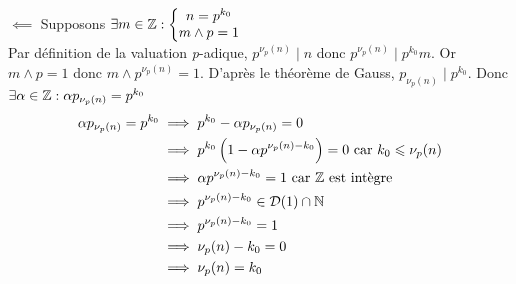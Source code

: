 \documentclass{article}
\renewenvironment{question_kholle}[2][ ]
{
	\subsection{\texorpdfstring{#2}{}}
	\notblank{#1}
	{
		\noindent #1
		\bigbreak
	}
	{}
	\begin{proof}
}
{
	\end{proof}
}
\begin{document}
\begin{question_kholle}
		$\impliedby$ Supposons $\exists m \in \mathbb Z : \left\{ \begin{matrix}
			n = p^{k_0} \\
			m \wedge p = 1
		\end{matrix} \right.$ \\
		Par définition de la valuation \textit{p}-adique, $p^{\nu_p(n)} \;|\; n$ donc $p^{\nu_p(n)} \;|\; p^{k_0} m$. Or $m \wedge p = 1$ donc $m \wedge p^{\nu_p(n)} = 1$.
		D'après le théorème de Gauss, $p_{\nu_p(n)} \;|\; p^{k_0}$. Donc $\exists \alpha \in \mathbb Z : \alpha p_{\nu_p(n)} = p^{k_0}$
		\begin{equation*}
			\begin{aligned}
				\alpha p_{\nu_p(n)} = p^{k_0}
				&\implies p^{k_0} - \alpha p_{\nu_p(n)} = 0 \\
				&\implies p^{k_0} \left( 1 - \alpha p^{\nu_p(n) - k_0} \right) = 0 \text{ car } k_0 \leqslant \nu_p(n) \\
				&\implies \alpha p^{\nu_p(n) - k_0} = 1 \text{ car \ensuremath{\mathbb Z} est intègre} \\
				&\implies p^{\nu_p(n) - k_0} \in \mathcal{D}(1) \cap \mathbb N \\
				&\implies p^{\nu_p(n) - k_0} = 1 \\
				&\implies \nu_p(n) - k_0 = 0 \\
				&\implies \nu_p(n) = k_0 \\
			\end{aligned}
		\end{equation*}
	\end{question_kholle}
\end{document}
